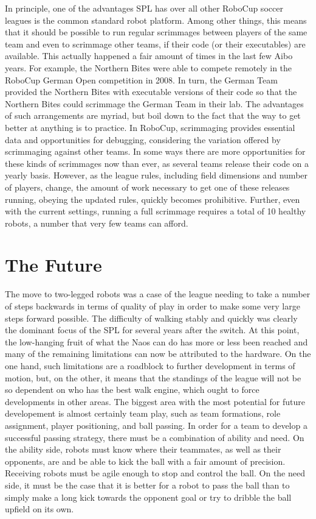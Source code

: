 \documentclass{llncs}
\begin{document}
In principle, one of the
advantages SPL has over all other RoboCup soccer
leagues is the common standard robot platform. Among other things, this
means that it should be possible to run regular scrimmages between players of the same team and even
to scrimmage other teams, if their code (or their executables) are available. This actually happened a fair amount of times in the last few
Aibo years. For example, the Northern Bites were able to compete remotely
in the RoboCup German Open competition in 2008. In turn, the German Team provided the
Northern Bites with executable versions of their code so that the Northern
Bites could scrimmage the German Team in their lab. The advantages of
such arrangements are myriad, but boil down to the fact that the way to
get better at anything is to practice. In RoboCup, scrimmaging provides
essential data and opportunities for debugging, considering the variation offered by scrimmaging
against other teams. In some
ways there are more opportunities for these kinds of scrimmages now than
ever, as several teams release their code on a yearly
basis. However, as the league rules, including field dimensions and number of players, change, the amount of work necessary to get
one of these releases running, obeying the updated rules, quickly becomes prohibitive.
Further, even with the current settings, running a full scrimmage requires a total of 10 healthy robots, a number
that very few teams can afford.

\section{The Future}

The move to two-legged robots was a case of the league needing to take a number
of steps backwards in terms of quality of play in order to make some very large
steps forward possible. The difficulty of walking stably and quickly was clearly the dominant
focus of the SPL for several years after the switch. At this point, the
low-hanging fruit of what the Naos can do has more or less been reached and many of the
remaining limitations can now be attributed to the hardware. On the one hand, such limitations
are a roadblock to further development in terms of motion, but, on the other,
it means that the standings of the league will not be so dependent on who
has the best walk engine, which ought to force developments in other areas.
The biggest area with the most potential for future developement is almost certainly team play,
such as team formations, role assignment, player positioning, and ball passing. In order for a team to develop a successful passing strategy,
there must be a combination of ability and need. On the ability side, robots must
know where their teammates, as well as their opponents, are and be able to kick the ball with a fair amount
of precision. Receiving robots must be agile enough to stop and control the
ball. On the need side, it must be the case that it is better for a robot to pass
the ball than to simply make a long kick towards the opponent goal or try to dribble the ball
upfield on its own.
\end{document}
